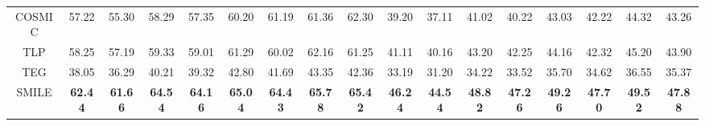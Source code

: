 \begin{table*}[ht]
{\begin{tabular}{@{}c|cccccccc|cccccccc@{}}
COSMIC                    & 57.22          & 55.30          & 58.29          & 57.35          & 60.20          & 61.19          & 61.36          & 62.30          & 39.20          & 37.11          & 41.02          & 40.22          & 43.03          & 42.22          & 44.32          & 43.26          \\
TLP                    & 58.25          & 57.19          & 59.33          & 59.01          & 61.29          & 60.02          & 62.16          & 61.25          & 41.11          & 40.16          & 43.20          & 42.25          & 44.16          & 42.32          & 45.20          & 43.90          \\
TEG                    & 38.05          & 36.29          & 40.21          & 39.32          & 42.80          & 41.69          & 43.35          & 42.36          & 33.19          & 31.20          & 34.22          & 33.52          & 35.70          & 34.62          & 36.55          & 35.37          \\ \midrule
SMILE                    & \textbf{62.44} & \textbf{61.66} & \textbf{64.54} & \textbf{64.16} & \textbf{65.04} & \textbf{64.43} & \textbf{65.78} & \textbf{65.42} & \textbf{46.24} & \textbf{44.54} & \textbf{48.82} & \textbf{47.26} & \textbf{49.26} & \textbf{47.70} & \textbf{49.52} & \textbf{47.88} \\ \midrule
\end{tabular} %
}
\end{table*}

